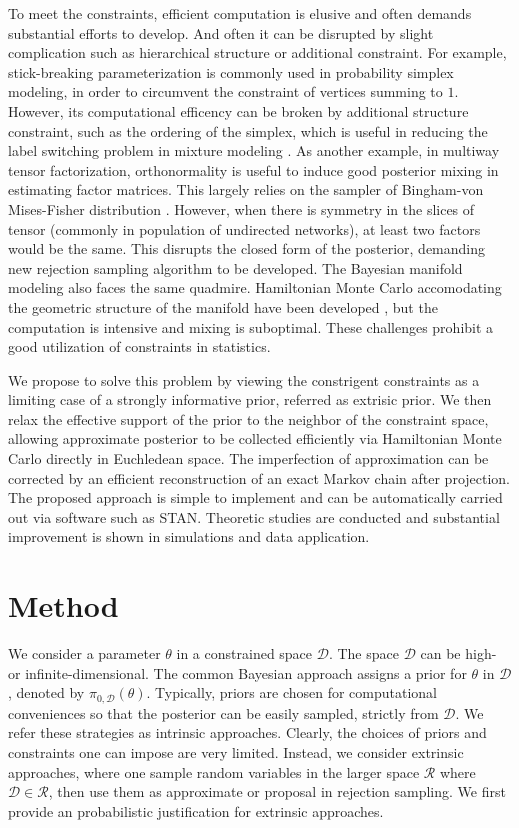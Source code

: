 \documentclass[10pt]{article}
\newcommand{\mc}[1]{\mathcal{#1}}
\begin{document}
To meet the constraints, efficient computation is elusive and often demands substantial efforts to develop. And often it can be disrupted by slight complication such as hierarchical structure or additional constraint. For example, stick-breaking parameterization is commonly used in probability simplex modeling, in order to circumvent the constraint of vertices summing to $1$. However, its computational efficency can be broken by additional structure constraint, such as the ordering of the simplex, which is useful in reducing the label switching problem in mixture modeling \citep{diebolt1994estimation}. As another example, in multiway tensor factorization, orthonormality is useful to induce good posterior mixing in estimating factor matrices. This largely relies on the sampler of Bingham-von Mises-Fisher distribution \citep{hoff2016equivariant}. However, when there is symmetry in the slices of tensor (commonly in population of undirected networks), at least two factors would be the same. This disrupts the closed form of the posterior, demanding new rejection sampling algorithm to be developed. The Bayesian manifold modeling also faces the same quadmire. Hamiltonian Monte Carlo accomodating the geometric structure of the manifold have been developed \citep{girolami2011riemann,byrne2013geodesic}, but the computation is intensive and mixing is suboptimal. These challenges prohibit a good utilization of constraints in statistics.

We propose to solve this problem by viewing the constrigent constraints as a limiting case of a strongly informative prior, referred as extrisic prior. We then relax the effective support of the prior to the neighbor of the constraint space, allowing approximate posterior to be collected efficiently via Hamiltonian Monte Carlo directly in Euchledean space. The imperfection of approximation can be corrected by an efficient reconstruction of an exact Markov chain after projection. The proposed approach is simple to implement and can be automatically carried out via software such as STAN. Theoretic studies are conducted and substantial improvement is shown in simulations and data application.




\section{Method}

We consider a parameter $\theta$ in a constrained space $\mc D$. The space $\mc D$ can be high- or infinite-dimensional. The common Bayesian approach assigns a prior for $\theta$ in $\mc D$, denoted by $\pi_{0,\mc D}(\theta)$. Typically, priors are chosen for computational conveniences so that the posterior can be easily sampled, strictly from $\mc D$. We refer these strategies as intrinsic approaches. Clearly, the choices of priors and constraints one can impose are very limited. Instead, we consider extrinsic approaches, where one sample random variables in the larger space $\mc R$ where $\mc D\in \mc R$, then use them as approximate or proposal in rejection sampling. We first provide an probabilistic justification for extrinsic approaches.
\end{document}
